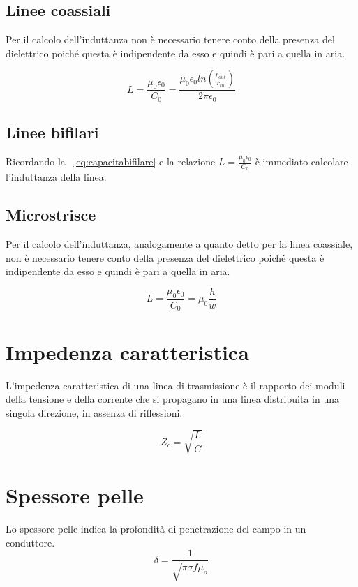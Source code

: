 \documentclass[10pt,a4paper]{report}
\begin{document}
		\subsection{Linee coassiali}

			Per il calcolo dell’induttanza non è necessario tenere conto della presenza del dielettrico
			poiché questa è indipendente da esso e quindi è pari a quella in aria.
		
			\begin{equation}
				L=\frac{\mu_0 \epsilon_0}{C_0}=\frac{\mu_0 \epsilon_0 ln (\frac { r_{out}} {r_{in} } )}{2\pi \epsilon_0}
			\end{equation}



		\subsection{Linee bifilari}

		Ricordando la ~\ref{eq:capacitabifilare} e la relazione $L=\frac{\mu_0 \epsilon_0}{C_0}$ è immediato calcolare l'induttanza della linea.

		\subsection{Microstrisce}
			
			Per il calcolo dell’induttanza, analogamente a quanto detto per la linea coassiale, non è necessario tenere conto della presenza del dielettrico
			poiché questa è indipendente da esso e quindi è pari a quella in aria.
		
			\begin{equation}
				L=\frac{\mu_0 \epsilon_0}{C_0}=\mu_0 \frac{h}{w}
			\end{equation}
	


	\section{Impedenza caratteristica}

			L'impedenza caratteristica di una linea di trasmissione è il rapporto dei moduli della tensione e della corrente che si propagano in una linea distribuita in una singola direzione, in assenza di riflessioni.

			\begin{equation}
				Z_c=\sqrt{\frac{L}{C}}
			\end{equation}

	\section{Spessore pelle}
			Lo spessore pelle indica la profondità di penetrazione del campo in un conduttore.
			\begin{equation}
			\delta=\frac{1}{	\sqrt{\pi \sigma f \mu_o}}
			\end{equation}
\end{document}
